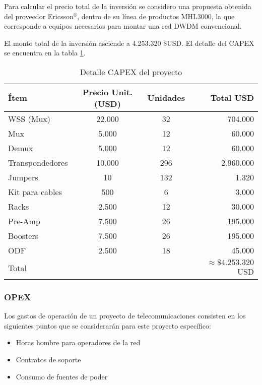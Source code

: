 Para calcular el precio total de la inversión se considero una propuesta obtenida del proveedor \newline Ericsson$^\circledR$, dentro de su línea de productos MHL3000, la que corresponde a equipos necesarios para montar una red DWDM convencional.

El monto total de la inversión asciende a 4.253.320 \$USD. El detalle del CAPEX se encuentra en la tabla \ref{tab:capex}.

\begin{table}[H]
  \centering
  \begin{tabular}{| l | c | c | r |}
    \hline
    \textbf{Ítem} & \textbf{Precio Unit. (USD)} & \textbf{Unidades} & \textbf{Total USD} \\
    \hline
    WSS (Mux) & 22.000 & 32 & 704.000\\
    \hline
   Mux  & 5.000 & 12 & 60.000 \\
    \hline
    Demux & 5.000 & 12 & 60.000 \\
    \hline
    Transpondedores  & 10.000 & 296 & 2.960.000 \\
    \hline
    Jumpers  & 10 & 132 & 1.320 \\
    \hline
    Kit para cables & 500 & 6 & 3.000 \\
    \hline
    Racks  & 2.500 & 12 & 30.000 \\
    \hline
    Pre-Amp & 7.500 & 26 & 195.000\\
    \hline
    Boosters & 7.500 & 26 & 195.000\\
    \hline
    ODF & 2.500 & 18 & 45.000\\
    \hline    
    Total & & & $\approx \$4.253.320$ USD \\
    \hline
  \end{tabular}
  \caption{Detalle CAPEX del proyecto}
  \label{tab:capex}
\end{table}

\subsubsection{OPEX}
\label{sec:opex}

Los gastos de operación de un proyecto de telecomunicaciones consisten en los siguientes puntos que se considerarán para este proyecto específico:
\begin{itemize}
\item Horas hombre para operadores de la red
\item Contratos de soporte
\item Consumo de fuentes de poder
\end{itemize}

